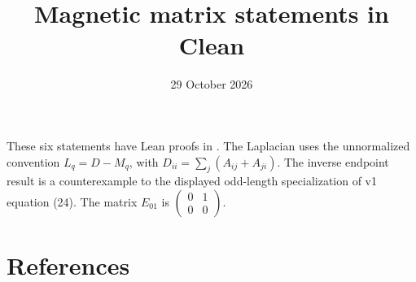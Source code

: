 \documentclass[11pt]{article}
\title{Magnetic matrix statements in Clean}
\author{}
\date{29 October 2026}
\begin{document}
\maketitle
{}\par\medskip
These six statements have Lean proofs in .
The Laplacian uses the unnormalized convention $L_q=D-M_q$, with
$D_{ii}=\sum_j(A_{ij}+A_{ji})$. The inverse endpoint result is a counterexample
to the displayed odd-length specialization of v1 equation (24).
The matrix $E_{01}$ is $\left(\begin{smallmatrix}0&1\\0&0\end{smallmatrix}\right)$.

\section*{References}

\end{document}

